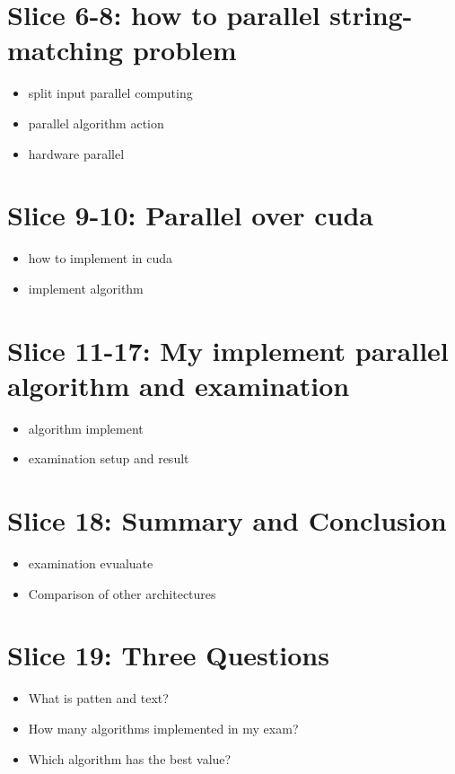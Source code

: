 \documentclass[11pt]{article}       %
\newenvironment{slide}[1]        {\section{#1} \begin{itemize}}%
                                 {\end{itemize}}
\begin{document}
\begin{slide}{Slice 6-8: how to parallel string-matching problem}
\item split input parallel computing
\item parallel algorithm action
\item hardware parallel
\end{slide}

\begin{slide}{Slice 9-10: Parallel over cuda}
\item how to implement in cuda
\item implement algorithm
\end{slide}

\begin{slide}{Slice 11-17: My implement parallel algorithm and examination }
\item algorithm implement
\item examination setup and result
\end{slide}


\begin{slide}{Slice 18: Summary and Conclusion }
\item examination evualuate
\item Comparison of other architectures
\end{slide}

\begin{slide}{Slice 19: Three Questions }
\item What is patten and text?
\item How many algorithms implemented in my exam?
\item Which algorithm has the best value?
\end{slide}




\end{document}
